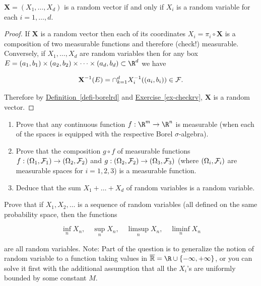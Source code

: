 \begin{lem}
$\mathbf{X}=(X_1,\ldots,X_d)$ is a random vector if
and only if $X_i$ is a random variable for each
$i=1,\ldots,d$.
\end{lem}

\begin{proof}
If $\mathbf{X}$ is a random vector then each of its
coordinates $X_i = \pi_i \circ \mathbf{X}$ is a
composition of two measurable functions and therefore
(check!) measurable. Conversely, if $X_1,\ldots,X_d$
are random variables then for any box
$E=(a_1,b_1)\times (a_2,b_2)\times\cdots\times
(a_d,b_d) \subset \R^d$
we have

\[
\mathbf{X}^{-1}(E) = \cap_{k=1}^d X_i^{-1}((a_i,b_i)) \in {\cal F}.
\]

\noindent Therefore by \hyperref[defi-borelrd]{Definition~\ref*{defi-borelrd}} and \texorpdfstring{\hyperref[ex-checkrv]{Exercise~\ref*{ex-checkrv}}}{Exercise}, $\mathbf{X}$ is a random vector.
\end{proof}

\begin{xexercise}

\begin{enumerate}[label=(\roman*)]
\item Prove that any continuous function $f:\R^m\to\R^n$ is
measurable (when each of the spaces is equipped with
the respective Borel $\sigma$-algebra).

\item Prove that the composition $g\circ f$ of measurable
functions
$f:(\Omega_1, {\cal F}_1)\to (\Omega_2,{\cal F}_2)$
and
$g:(\Omega_2, {\cal F}_2)\to (\Omega_3, {\cal F}_3)$
(where $(\Omega_i, {\cal F}_i)$ are measurable spaces
for $i=1,2,3$) is a measurable function.

\item Deduce that the sum $X_1+\ldots+X_d$ of random
variables is a random variable.
\end{enumerate}

\end{xexercise}

\begin{xexercise}
Prove that if $X_1, X_2, \ldots$ is a sequence of
random variables (all defined on the same probability
space, then the functions

\[
\inf_n X_n, \quad \sup_n X_n, \quad \limsup_n X_n, \quad \liminf_n X_n
\]

\noindent are all random variables. Note: Part of the question
is to generalize the notion of random variable to a
function taking values in
$\overline{\mathbb{R}} = \R \cup \{-\infty, +\infty
\}$,
or you can solve it first with the additional
assumption that all the $X_i$'s are uniformly bounded
by some constant $M$.
\end{xexercise}
